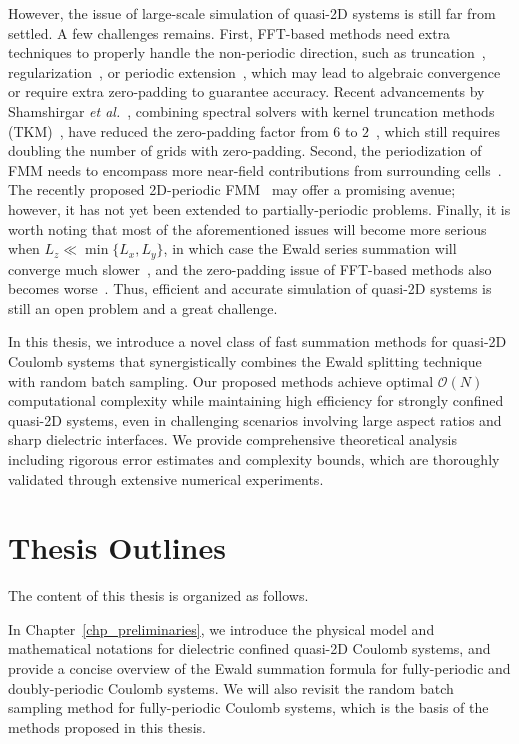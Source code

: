 However, the issue of large-scale simulation of quasi-2D systems is still far from settled.
A few challenges remains. First, FFT-based methods need extra techniques to properly handle the non-periodic direction, such as truncation~\cite{parry1975electrostatic}, regularization~\cite{nestler2015fast}, or periodic extension~\cite{lindbo2012fast}, which may lead to algebraic convergence or require extra zero-padding to guarantee accuracy. 
Recent advancements by Shamshirgar \emph{et al.}~\cite{shamshirgar2021fast}, combining spectral solvers with kernel truncation methods (TKM)~\cite{vico2016fast}, have reduced the zero-padding factor from $6$ to $2$~\cite{lindbo2012fast}, which still requires doubling the number of grids with zero-padding. 
Second, the periodization of FMM needs to encompass more near-field contributions from surrounding cells~\cite{yan2018flexibly,barnett2018unified}. The recently proposed 2D-periodic FMM~\cite{PEI2023111792} may offer a promising avenue; however, it has not yet been extended to partially-periodic problems.
Finally, it is worth noting that most of the aforementioned issues will become more serious when $L_z\ll \min\{L_x, L_y\}$, in which case the Ewald series summation will converge much slower~\cite{arnold2002electrostatics}, and the zero-padding issue of FFT-based methods also becomes worse~\cite{maxian2021fast}.
Thus, efficient and accurate simulation of quasi-2D systems is still an open problem and a great challenge.

In this thesis, we introduce a novel class of fast summation methods for quasi-2D Coulomb systems that synergistically combines the Ewald splitting technique with random batch sampling. 
Our proposed methods achieve optimal $\mathcal{O}(N)$ computational complexity while maintaining high efficiency for strongly confined quasi-2D systems, even in challenging scenarios involving large aspect ratios and sharp dielectric interfaces. 
We provide comprehensive theoretical analysis including rigorous error estimates and complexity bounds, which are thoroughly validated through extensive numerical experiments.

\section{Thesis Outlines}

The content of this thesis is organized as follows.

In Chapter~\ref{chp_preliminaries}, we introduce the physical model and mathematical notations for dielectric confined quasi-2D Coulomb systems, and provide a concise overview of the Ewald summation formula for fully-periodic and doubly-periodic Coulomb systems.
We will also revisit the random batch sampling method for fully-periodic Coulomb systems, which is the basis of the methods proposed in this thesis.

